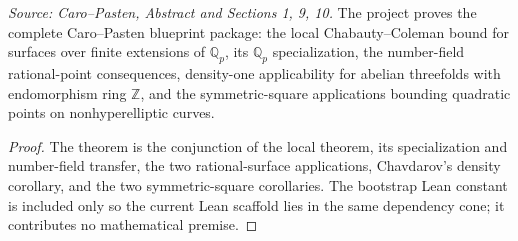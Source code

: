 \begin{theorem}
  \label{thm:cp_project_goal}
  \textit{Source: Caro--Pasten, Abstract and Sections 1, 9, 10.}
  The project proves the complete Caro--Pasten blueprint package: the local
  Chabauty--Coleman bound for surfaces over finite extensions of
  \(\mathbb Q_p\), its \(\mathbb Q_p\) specialization, the number-field
  rational-point consequences, density-one applicability for abelian
  threefolds with endomorphism ring \(\mathbb Z\), and the symmetric-square
  applications bounding quadratic points on nonhyperelliptic curves.
\end{theorem}
\begin{proof}
  The theorem is the conjunction of the local theorem, its specialization and
  number-field transfer, the two rational-surface applications, Chavdarov's
  density corollary, and the two symmetric-square corollaries.  The bootstrap
  Lean constant is included only so the current Lean scaffold lies in the same
  dependency cone; it contributes no mathematical premise.
\end{proof}
